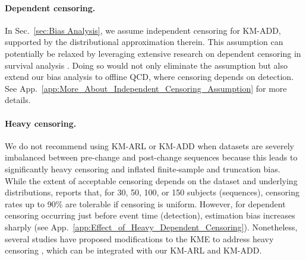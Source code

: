 \documentclass{article}
\theoremstyle{plain}
\theoremstyle{definition}
\theoremstyle{remark}
\begin{document}
\paragraph{Dependent censoring.}
In Sec.~\ref{sec:Bias Analysis}, we assume independent censoring for KM-ADD, supported by the distributional approximation therein.
This assumption can potentially be relaxed by leveraging extensive research on dependent censoring in survival analysis \citep{hsu2010robust, lin2023informative, crommen2025recent}.
Doing so would not only eliminate the assumption but also extend our bias analysis to offline QCD, where censoring depends on detection. See App.~\ref{app:More_About_Independent_Censoring_Assumption} for more details.


\paragraph{Heavy censoring.}
We do not recommend using KM-ARL or KM-ADD when datasets are severely imbalanced between pre-change and post-change sequences because this leads to significantly heavy censoring and inflated finite‑sample and truncation bias. 
While the extent of acceptable censoring depends on the dataset and underlying distributions, \citet{malmquist2025what} reports that, for 30, 50, 100, or 150 subjects (sequences), censoring rates up to 90\% are tolerable if censoring is uniform. 
However, for dependent censoring occurring just before event time (detection), estimation bias increases sharply (see App.~\ref{app:Effect_of_Heavy_Dependent_Censoring}). 
Nonetheless, several studies have proposed modifications to the KME to address heavy censoring \citep{shafiq2007modified, zare2013modified}, which can be integrated with our KM-ARL and KM-ADD.


\end{document}
